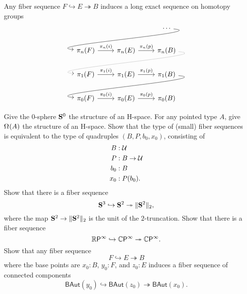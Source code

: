\begin{thm}
Any fiber sequence $F\hookrightarrow E\twoheadrightarrow B$ induces a long exact sequence on homotopy groups
\begin{equation*}
\begin{tikzcd}
& & \cdots \arrow[out=355,in=175,dll] \\
\pi_n(F) \arrow[r,"\pi_n(i)"] & \pi_n(E) \arrow[r,"\pi_n(p)"] & \pi_n(B) \arrow[out=355,in=175,dll,densely dotted] \\
\pi_1(F) \arrow[r,"\pi_1(i)"] & \pi_1(E) \arrow[r,"\pi_1(p)"] & \pi_1(B) \arrow[out=355,in=175,dll] \\
\pi_0(F) \arrow[r,"\pi_0(i)"] & \pi_0(E) \arrow[r,"\pi_0(p)"] & \pi_0(B)
\end{tikzcd}
\end{equation*}
\end{thm}


\begin{exercises}
\exercise Give the $0$-sphere $\mathbf{S}^{0}$ the structure of an H-space.
\exercise For any pointed type $A$, give $\Omega^{}(A)$ the structure of an H-space.
\exercise Show that the type of (small) fiber sequences is equivalent to the type of quadruples $(B,P,b_0,x_0)$, consisting of
\begin{align*}
B & : \mathcal{U} \\
P & : B \to \mathcal{U} \\
b_0 & : B \\
x_0 & : P(b_0).
\end{align*}
\exercise Show that there is a fiber sequence
\begin{equation*}
  \mathbf{S}^{3}\hookrightarrow\mathbf{S}^{2}\twoheadrightarrow\Vert \mathbf{S}^{2}\Vert_{2},
\end{equation*}
where the map $\mathbf{S}^{2}\to\Vert \mathbf{S}^{2}\Vert_{2}$ is the unit of the $2$-truncation.
\exercise Show that there is a fiber sequence
\begin{equation*}
  \mathbb{R}\mathsf{P}^{\infty}\hookrightarrow\mathbb{C}\mathsf{P}^{\infty}\twoheadrightarrow\mathbb{C}\mathsf{P}^{\infty}.
\end{equation*}
\exercise Show that any fiber sequence
\begin{equation*}
  F \hookrightarrow E \twoheadrightarrow B
\end{equation*}
where the base points are $x_0:B$, $y_0:F$, and $z_0:E$ induces a fiber sequence of connected components
\begin{equation*}
  \mathsf{BAut}(y_0) \hookrightarrow \mathsf{BAut}(z_0) \twoheadrightarrow \mathsf{BAut}(x_0).
\end{equation*}
\end{exercises}
